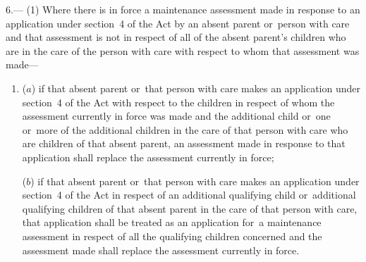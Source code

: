\documentclass[a4paper,12pt]{article}
\begin{document}
6.—%
%
%
%
%
%
(1) Where there is in force a maintenance assessment made in response to an application under section~4 of the Act by an absent parent or~person with care and that assessment is not in respect of all of the absent parent’s children who are in the care of the person with care with respect to whom that assessment was made—
\begin{enumerate}\item[]
($a$) if that absent parent or~that person with care makes an application under section~4 of the Act with respect to the children in respect of whom the assessment currently in force was made and the additional child or~one or~more of the additional children in the care of that person with care who are children of that absent parent, an assessment made in response to that application shall replace the assessment currently in force;

($b$) if that absent parent or~that person with care makes an application under section~4 of the Act in respect of an additional qualifying child or~additional qualifying children of that absent parent in the care of that person with care, that application shall be treated as an application for~a maintenance assessment in respect of all the qualifying children concerned and the assessment made shall replace the assessment currently in force.
\end{enumerate}
\end{document}
